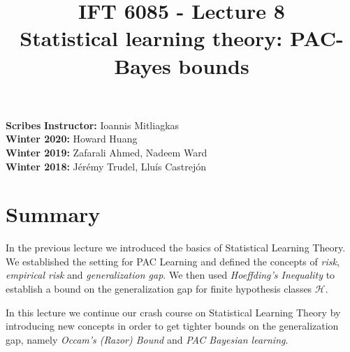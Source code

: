 \documentclass{article}
\title{IFT 6085 - Lecture 8 \\ 
Statistical learning theory: PAC-Bayes bounds}
\date{}
\begin{document}
 

\maketitle
\textbf{Scribes}\hfill
\textbf{Instructor:} Ioannis Mitliagkas\\
\textbf{Winter 2020:} Howard Huang\\
\textbf{Winter 2019:} Zafarali Ahmed, Nadeem Ward\\
\textbf{Winter 2018:} Jérémy Trudel, Lluís Castrejón
\hfill



\newcommand{\infgc}{\inf_{g \in \mathcal{C}}}
\newcommand{\supgc}{\sup_{g \in \mathcal{C}}}

\newcommand{\Prob}{\mathbb{P}}
\newcommand{\E}{\mathbb{E}}
\newcommand{\reals}{\mathbb{R}}


\section{Summary}
In the previous lecture we introduced the basics of Statistical Learning Theory. We established the setting for PAC Learning and defined the concepts of \textit{risk}, \textit{empirical risk} and \textit{generalization gap}. We then used \textit{Hoeffding's Inequality} to establish a bound on the generalization gap for finite hypothesis classes $\mathcal{H}$.

\vspace{2ex}

In this lecture we continue our crash course on Statistical Learning Theory by introducing new concepts in order to get tighter bounds on the generalization gap, namely \textit{Occam's (Razor) Bound} and \textit{PAC Bayesian learning}. 
\end{document}
